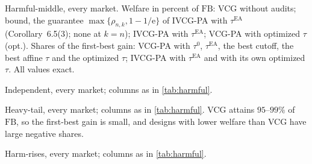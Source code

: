 \documentclass[11pt]{article}
\newcommand{\FB}{\mathrm{FB}}
\newcommand{\tauea}{\tau^{\mathrm{EA}}}
\newcommand{\eul}{\mathrm{e}}
\begin{document}
\begin{table}[htbp]
\centering\footnotesize

\caption{Harmful-middle, every market. Welfare in percent of $\FB$: VCG without audits; bound, the guarantee $\max\{\rho_{n,k},1-1/\eul\}$ of IVCG-PA with $\tauea$ (Corollary~6.5(3); none at $k=n$); IVCG-PA with $\tauea$; VCG-PA with optimized $\tau$ (opt.). Shares of the first-best gain: VCG-PA with $\tau^0$, $\tauea$, the best cutoff, the best affine $\tau$ and the optimized $\tau$; IVCG-PA with $\tauea$ and with its own optimized $\tau$. All values exact.}
\label{tab:harmful}
\end{table}

\begin{table}[htbp]
\centering\footnotesize

\caption{Independent, every market; columns as in \cref{tab:harmful}.}
\label{tab:independent}
\end{table}

\begin{table}[htbp]
\centering\footnotesize

\caption{Heavy-tail, every market; columns as in \cref{tab:harmful}. VCG attains $95$--$99\%$ of $\FB$, so the first-best gain is small, and designs with lower welfare than VCG have large negative shares.}
\label{tab:heavy}
\end{table}

\begin{table}[htbp]
\centering\footnotesize

\caption{Harm-rises, every market; columns as in \cref{tab:harmful}.}
\label{tab:rises}
\end{table}
\end{document}
